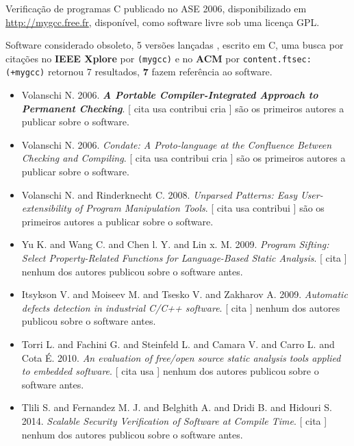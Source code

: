 Verificação de programas C
publicado no ASE 2006,
disponibilizado em \url{http://mygcc.free.fr},
disponível,
como software livre
sob uma licença GPL.

Software considerado obsoleto,
5 versões lançadas
,
escrito em C,
uma busca por citações no {\bf IEEE Xplore} por
\texttt{(mygcc)}
e no {\bf ACM} por
\texttt{content.ftsec:(+mygcc)}
retornou
7 resultados,
{\bf 7} fazem referência ao software.

\begin{itemize}
\item Volanschi N.
      2006.
        \textbf{\textit{ A Portable Compiler-Integrated Approach to Permanent Checking}}.
      [
          cita
          usa
          contribui
          cria
      ]
são os primeiros autores a publicar sobre o software.
\item Volanschi N.
      2006.
        \textit{ Condate: A Proto-language at the Confluence Between Checking and Compiling}.
      [
          cita
          usa
          contribui
          cria
      ]
são os primeiros autores a publicar sobre o software.
\item Volanschi N. and Rinderknecht C.
      2008.
        \textit{ Unparsed Patterns: Easy User-extensibility of Program Manipulation Tools}.
      [
          cita
          usa
          contribui
      ]
são os primeiros autores a publicar sobre o software.
\item Yu K. and Wang C. and Chen l. Y. and Lin x. M.
      2009.
        \textit{ Program Sifting: Select Property-Related Functions for Language-Based Static Analysis}.
      [
          cita
      ]
nenhum dos autores publicou sobre o software antes.
\item Itsykson V. and Moiseev M. and Tsesko V. and Zakharov A.
      2009.
        \textit{ Automatic defects detection in industrial C/C++ software}.
      [
          cita
      ]
nenhum dos autores publicou sobre o software antes.
\item Torri L. and Fachini G. and Steinfeld L. and Camara V. and Carro L. and Cota É.
      2010.
        \textit{ An evaluation of free/open source static analysis tools applied to embedded software}.
      [
          cita
          usa
      ]
nenhum dos autores publicou sobre o software antes.
\item Tlili S. and Fernandez M. J. and Belghith A. and Dridi B. and Hidouri S.
      2014.
        \textit{ Scalable Security Verification of Software at Compile Time}.
      [
          cita
      ]
nenhum dos autores publicou sobre o software antes.
\end{itemize}
